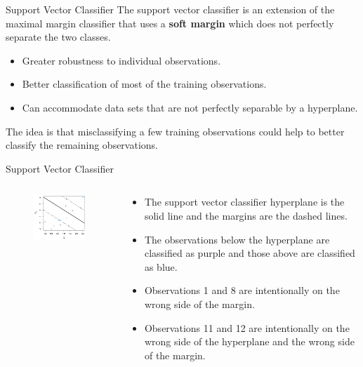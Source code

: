 \documentclass[
  ignorenonframetext,
  aspectratio=169,
]{beamer}
\begin{document}
\begin{frame}{Support Vector Classifier}
\protect\hypertarget{support-vector-classifier}{}
The support vector classifier is an extension of the maximal margin
classifier that uses a
\alert{\textbf{soft margin} which does not perfectly separate the two classes}.

\begin{itemize}
\item
  Greater robustness to individual observations.
\item
  Better classification of most of the training observations.
\item
  Can accommodate data sets that are not perfectly separable by a
  hyperplane.
\end{itemize}

The idea is that
\alert{misclassifying a few training observations could help to better classify the remaining observations}.
\end{frame}

\begin{frame}{Support Vector Classifier}
\protect\hypertarget{support-vector-classifier-1}{}
\begin{columns}[T]
\begin{column}{0.5\textwidth}
\begin{figure}

{\centering \includegraphics[width=2.60417in,height=\textheight]{images/soft_margin.png}

}

\end{figure}
\end{column}

\begin{column}{0.5\textwidth}
\begin{itemize}
\item
  The support vector classifier hyperplane is the solid line and the
  margins are the dashed lines.
\item
  The observations below the hyperplane are classified as purple and
  those above are classified as blue.
\item
  Observations 1 and 8 are intentionally on the wrong side of the
  margin.
\item
  Observations 11 and 12 are intentionally on the wrong side of the
  hyperplane and the wrong side of the margin.
\end{itemize}
\end{column}
\end{columns}
\end{frame}
\end{document}
